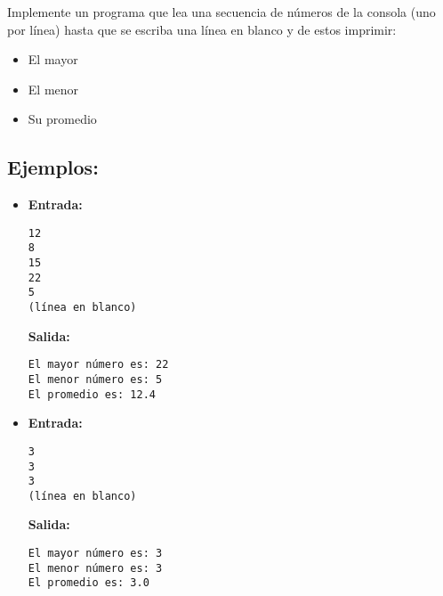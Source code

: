 Implemente un programa que lea una secuencia de números de la consola (uno por línea) hasta que se escriba una línea en blanco y de estos imprimir:
\begin{itemize}
    \item El mayor
    \item El menor
    \item Su promedio
\end{itemize}

\subsection*{Ejemplos:}
\begin{itemize}
    \item \textbf{Entrada:}
\begin{verbatim}
12
8
15
22
5
(línea en blanco)
\end{verbatim}
    \textbf{Salida:}
\begin{verbatim}
El mayor número es: 22
El menor número es: 5
El promedio es: 12.4
\end{verbatim}

    \item \textbf{Entrada:}
\begin{verbatim}
3
3
3
(línea en blanco)
\end{verbatim}
    \textbf{Salida:}
\begin{verbatim}
El mayor número es: 3
El menor número es: 3
El promedio es: 3.0
\end{verbatim}
\end{itemize}
